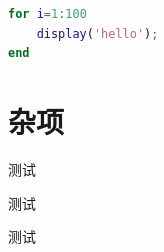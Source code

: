 \documentclass[bachelor]{XJTUthesis}
\begin{document}
\begin{lstlisting}[language=matlab]
for i=1:100
    display('hello');
end
\end{lstlisting}

\chapter{杂项}

\begin{appendixs}
测试
\end{appendixs}

\begin{appendixs}
测试
\end{appendixs}

\begin{appendixs}
测试
\end{appendixs}

\begin{acknowledgement}
\chaptername
\end{acknowledgement}

\printbibliography[heading=bibliography,title=参考文献]
\end{document}
